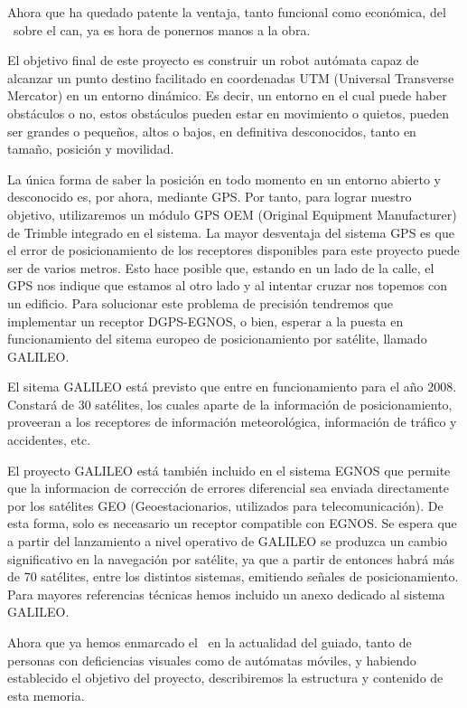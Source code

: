 Ahora que ha quedado patente la ventaja, tanto funcional como económica, del \bott\ sobre el can, ya es hora de ponernos manos a la obra.\par
El objetivo final de este proyecto es construir un robot autómata capaz de alcanzar un punto destino facilitado en coordenadas UTM (Universal Transverse Mercator) en un entorno dinámico. Es decir, un entorno en el cual puede haber obstáculos o no, estos obstáculos pueden estar en movimiento o quietos, pueden ser grandes o pequeños, altos o bajos, en definitiva desconocidos, tanto en tamaño, posición y movilidad.\par
La única forma de saber la posición en todo momento en un entorno abierto y desconocido es, por ahora, mediante GPS. Por tanto, para lograr nuestro objetivo, utilizaremos un módulo GPS OEM (Original Equipment Manufacturer) de Trimble integrado en el sistema. La mayor desventaja del sistema GPS es que el error de posicionamiento de los receptores disponibles para este proyecto puede ser de varios metros. Esto hace posible que, estando en un lado de la calle, el GPS nos indique que estamos al otro lado y al intentar cruzar nos topemos con un edificio. Para solucionar este problema de precisión tendremos que implementar un receptor DGPS-EGNOS, o bien, esperar a la puesta en funcionamiento del sitema europeo de posicionamiento por satélite, llamado GALILEO\cite{web:galileo}.\par
El sitema GALILEO está previsto que entre en funcionamiento para el año 2008. Constará de 30 satélites, los cuales aparte de la información de posicionamiento, proveeran a los receptores de información meteorológica, información de tráfico y accidentes, etc.\par
El proyecto GALILEO está también incluido en el sistema EGNOS que permite que la informacion de corrección de errores diferencial sea enviada directamente por los satélites GEO (Geoestacionarios, utilizados para telecomunicación). De esta forma, solo es neceasario un receptor compatible con EGNOS. Se espera que a partir del lanzamiento a nivel operativo de GALILEO se produzca un cambio significativo en la navegación por satélite, ya que a partir de entonces habrá más de 70 satélites, entre los distintos sistemas, emitiendo señales de posicionamiento. Para mayores referencias técnicas hemos incluido un anexo dedicado al sistema GALILEO.\par
Ahora que ya hemos enmarcado el \bott\ en la actualidad del guiado, tanto de personas con deficiencias visuales como de autómatas móviles, y habiendo establecido el objetivo del proyecto, describiremos la estructura y contenido de esta memoria.
